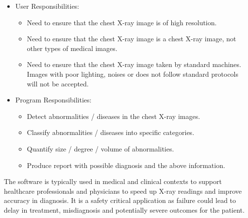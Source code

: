 \documentclass[12pt]{article}
\begin{document}
\begin{itemize}
\item User Responsibilities:
\begin{itemize}
\item {Need to ensure that the chest X-ray image is of high resolution. }
\item {Need to ensure that the chest X-ray image is a chest X-ray image, not other types of medical images.}
\item {Need to ensure that the chest X-ray image taken by standard machines. Images with poor lighting, noises or does not follow standard protocols will not be accepted. }
\end{itemize}
\item Program Responsibilities:
\begin{itemize}
\item {Detect abnormalities / diseases in the chest X-ray images.}
\item {Classify abnormalities / diseases into specific categories.}
\item {Quantify size / degree / volume of abnormalities.}
\item {Produce report with possible diagnosis and the above information.}
\end{itemize}
\end{itemize}
The software is typically used in medical and clinical contexts to support healthcare professionals and physicians to speed up X-ray readings and improve accuracy in diagnosis. It is a safety critical application as failure could lead to delay in treatment, misdiagnosis and potentially severe outcomes for the patient.
\end{document}
